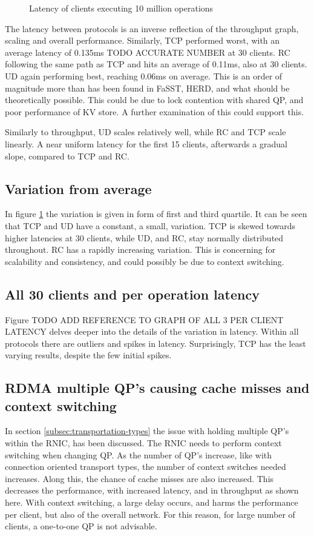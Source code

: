 \begin{figure}
    \centering
    
    \caption{Latency of clients executing 10 million operations}
    \label{fig:latency-30}
\end{figure}

The latency between protocols is an inverse reflection of the throughput graph, scaling and overall performance.
Similarly, TCP performed worst, with an average latency of 0.135ms TODO ACCURATE NUMBER at 30 clients.
RC following the same path as TCP and hits an average of 0.11ms, also at 30 clients.
UD again performing best, reaching 0.06ms on average.
This is an order of magnitude more than has been found in FaSST\cite{kalia2016fasst}, HERD\cite{kalia2014using}, and what should be theoretically possible.
This could be due to lock contention with shared QP, and poor performance of KV store.
A further examination of this could support this.

Similarly to throughput, UD scales relatively well, while RC and TCP scale linearly.
A near uniform latency for the first 15 clients, afterwards a gradual slope, compared to TCP and RC.

\subsection{Variation from average}
In figure \ref{fig:latency-30} the variation is given in form of first and third quartile.
It can be seen that TCP and UD have a constant, a small, variation.
TCP is skewed towards higher latencies at 30 clients, while UD, and RC, stay normally distributed throughout.
RC has a rapidly increasing variation.
This is concerning for scalability and consistency, and could possibly be due to context switching.

\subsection{All 30 clients and per operation latency}\label{subsec:all-30-clients-and-per-operation-latency}
Figure TODO ADD REFERENCE TO GRAPH OF ALL 3 PER CLIENT LATENCY delves deeper into the details of the variation in latency.
Within all protocols there are outliers and spikes in latency.
Surprisingly, TCP has the least varying results, despite the few initial spikes.

\subsection{RDMA multiple QP's causing cache misses and context switching}
In section \ref{subsec:transportation-types} the issue with holding multiple QP's within the RNIC, has been discussed.
The RNIC needs to perform context switching when changing QP.
As the number of QP's increase, like with connection oriented transport types, the number of context switches needed increases.
Along this, the chance of cache misses are also increased.
This decreases the performance, with increased latency, and in throughput as shown here.
With context switching, a large delay occurs, and harms the performance per client, but also of the overall network.
For this reason, for large number of clients, a one-to-one QP is not advisable.

